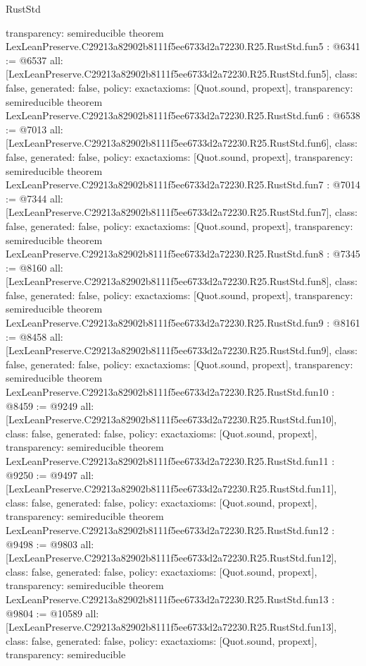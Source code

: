 \begin{lexlean}{RustStd}
\begin{coremodule}
{  transparency: semireducible
}
theorem LexLeanPreserve.C29213a82902b8111f5ee6733d2a72230.R25.RustStd.fun5 : @6341 := @6537 {
  all: [LexLeanPreserve.C29213a82902b8111f5ee6733d2a72230.R25.RustStd.fun5],
  class: false,
  generated: false,
  policy: exact{axioms: [Quot.sound, propext]},
  transparency: semireducible
}
theorem LexLeanPreserve.C29213a82902b8111f5ee6733d2a72230.R25.RustStd.fun6 : @6538 := @7013 {
  all: [LexLeanPreserve.C29213a82902b8111f5ee6733d2a72230.R25.RustStd.fun6],
  class: false,
  generated: false,
  policy: exact{axioms: [Quot.sound, propext]},
  transparency: semireducible
}
theorem LexLeanPreserve.C29213a82902b8111f5ee6733d2a72230.R25.RustStd.fun7 : @7014 := @7344 {
  all: [LexLeanPreserve.C29213a82902b8111f5ee6733d2a72230.R25.RustStd.fun7],
  class: false,
  generated: false,
  policy: exact{axioms: [Quot.sound, propext]},
  transparency: semireducible
}
theorem LexLeanPreserve.C29213a82902b8111f5ee6733d2a72230.R25.RustStd.fun8 : @7345 := @8160 {
  all: [LexLeanPreserve.C29213a82902b8111f5ee6733d2a72230.R25.RustStd.fun8],
  class: false,
  generated: false,
  policy: exact{axioms: [Quot.sound, propext]},
  transparency: semireducible
}
theorem LexLeanPreserve.C29213a82902b8111f5ee6733d2a72230.R25.RustStd.fun9 : @8161 := @8458 {
  all: [LexLeanPreserve.C29213a82902b8111f5ee6733d2a72230.R25.RustStd.fun9],
  class: false,
  generated: false,
  policy: exact{axioms: [Quot.sound, propext]},
  transparency: semireducible
}
theorem LexLeanPreserve.C29213a82902b8111f5ee6733d2a72230.R25.RustStd.fun10 : @8459 := @9249 {
  all: [LexLeanPreserve.C29213a82902b8111f5ee6733d2a72230.R25.RustStd.fun10],
  class: false,
  generated: false,
  policy: exact{axioms: [Quot.sound, propext]},
  transparency: semireducible
}
theorem LexLeanPreserve.C29213a82902b8111f5ee6733d2a72230.R25.RustStd.fun11 : @9250 := @9497 {
  all: [LexLeanPreserve.C29213a82902b8111f5ee6733d2a72230.R25.RustStd.fun11],
  class: false,
  generated: false,
  policy: exact{axioms: [Quot.sound, propext]},
  transparency: semireducible
}
theorem LexLeanPreserve.C29213a82902b8111f5ee6733d2a72230.R25.RustStd.fun12 : @9498 := @9803 {
  all: [LexLeanPreserve.C29213a82902b8111f5ee6733d2a72230.R25.RustStd.fun12],
  class: false,
  generated: false,
  policy: exact{axioms: [Quot.sound, propext]},
  transparency: semireducible
}
theorem LexLeanPreserve.C29213a82902b8111f5ee6733d2a72230.R25.RustStd.fun13 : @9804 := @10589 {
  all: [LexLeanPreserve.C29213a82902b8111f5ee6733d2a72230.R25.RustStd.fun13],
  class: false,
  generated: false,
  policy: exact{axioms: [Quot.sound, propext]},
  transparency: semireducible
}
\end{coremodule}
\end{lexlean}
